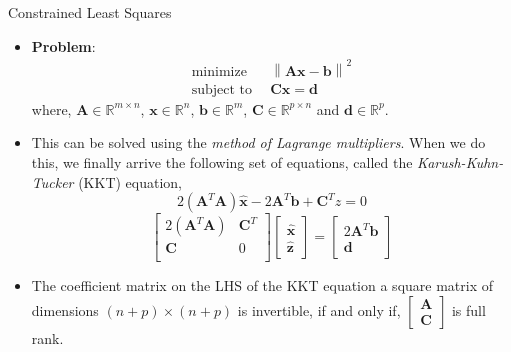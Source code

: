 \documentclass[aspectratio=169]{beamer}
\let\olditem\item
\renewcommand{\item}{\setlength{\itemsep}{\fill}\olditem}
\begin{document}
\begin{frame}[t]{Constrained Least Squares}
\begin{small}
\begin{itemize}
    \item \textbf{Problem}:
    \vspace{-0.5cm}
    \[
    \begin{split}
    \text{minimize} & \,\,\, \left\lVert \mathbf{Ax} - \mathbf{b}\right\rVert^2\\
    \text{subject to} & \,\,\, \mathbf{Cx} = \mathbf{d}
    \end{split} 
    \]
    where, $\mathbf{A} \in \mathbb{R}^{m \times n}$, $\mathbf{x} \in \mathbb{R}^n$, $\mathbf{b} \in \mathbb{R}^m$, $\mathbf{C} \in \mathbb{R}^{p \times n}$ and $\mathbf{d} \in \mathbb{R}^p$.

    \item This can be solved using the \textit{method of Lagrange multipliers}. When we do this, we finally arrive the following set of equations, called the \textit{Karush-Kuhn-Tucker} (KKT) equation,
    \[  2\left(\mathbf{A}^T\mathbf{A}\right)\hat{\mathbf{x}} - 2\mathbf{A}^T\mathbf{b} + \mathbf{C}^T\hat{z} = 0  \]
    \[  \begin{bmatrix*}
    2\left(\mathbf{A}^T\mathbf{A}\right) & \mathbf{C}^T\\
    \mathbf{C} & 0\\ 
    \end{bmatrix*}\begin{bmatrix*} \hat{\mathbf{x}}\\ \hat{\mathbf{z}}\end{bmatrix*} = \begin{bmatrix*} 2\mathbf{A}^T\mathbf{b} \\ \mathbf{d}\end{bmatrix*} \]
    \item The coefficient matrix on the LHS of the KKT equation a square matrix of dimensions $\left(n+p\right) \times \left(n+p\right)$ is invertible, if and only if, $\begin{bmatrix}\mathbf{A}\\\mathbf{C}\end{bmatrix}$ is full rank.
\end{itemize}
\end{small}
\end{frame}
\end{document}
